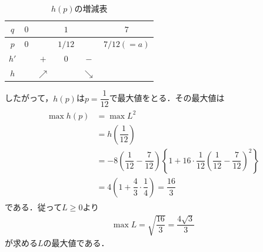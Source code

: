 \documentclass[../../main.tex]{subfiles}
\begin{document}
\begin{table}[htb]
  \centering
  \caption{$h(p)$の増減表}
  \begin{tabular}{c|ccccc}
    $q$ & $0$ & & $1$ & & $7$ \\
    \hline
    $p$ & $0$ & & $1/12$ & & $7/12(=a)$ \\
    \hline
    $h'$ & & $+$ & $0$ & $-$ & \\
    \hline
    $h$ & & $\nearrow$ & & $\searrow$ &
  \end{tabular}
\end{table}

したがって，$h(p)$は$p=\dfrac{1}{12}$で最大値をとる．その最大値は
\begin{align}
  \begin{split}
    \max h(p)
    &= \max L^2 \\
    &= h\left(\dfrac{1}{12}\right) \\
    &=-8\left(\dfrac{1}{12}-\dfrac{7}{12}\right)\left\{1+16\cdot\dfrac{1}{12}\left(\dfrac{1}{12}-\dfrac{7}{12}\right)^2\right\} \\
    &=4\left(1+\dfrac{4}{3}\cdot\dfrac{1}{4}\right)=\dfrac{16}{3}
  \end{split}
\end{align}
である．従って$L\ge 0$より
\begin{align}
  \max L=\sqrt{\dfrac{16}{3}}=\dfrac{4\sqrt{3}}{3}
\end{align}
が求める$L$の最大値である．

\newpage
\end{document}
